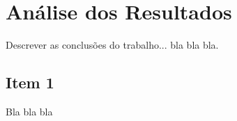 \chapter{Análise dos Resultados}
\label{ch:resultados}
Descrever as conclusões do trabalho... bla bla bla.

\section{Item 1}
Bla bla bla